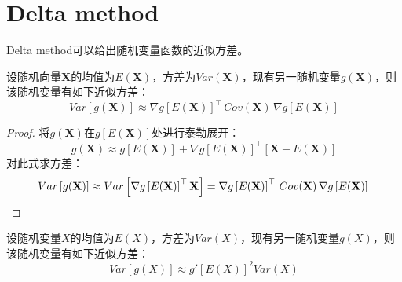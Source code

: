 \section{Delta method}
Delta method可以给出随机变量函数的近似方差。
\begin{theorem}\label{sec:deltamethod}
	设随机向量$\mathbf{X}$的均值为$E(\mathbf{X})$，方差为$Var(\mathbf{X})$，现有另一随机变量$g(\mathbf{X})$，则该随机变量有如下近似方差：
	\begin{equation*}
		Var[g(\mathbf{X})] \approx \nabla g\left[ E(\mathbf{X})\right]^{\top} \, Cov(\mathbf{X}) \, \nabla g\left[E(\mathbf{X})\right] 
	\end{equation*}
\end{theorem}
\begin{proof}
	将$g(\mathbf{X})$在$g\left[E(\mathbf{X})\right]$处进行泰勒展开：
	\begin{equation*}
		g(\mathbf{X})\approx g\left[E(\mathbf{X})\right]+
		\nabla g\left[E(\mathbf{X})\right]^{\top}\left[\mathbf{X}-E(\mathbf{X})\right]
	\end{equation*}
	对此式求方差：
	\begin{equation*}
		Var\left[g(\mathbf{X})\right]\approx Var\left[ \nabla g\left[E(\mathbf{X})\right]^{\top}\mathbf{X}\right]=\nabla g\left[ E(\mathbf{X})\right] ^{\top} \, Cov(\mathbf{X}) \, \nabla g\left[E(\mathbf{X})\right]\qedhere
	\end{equation*}
\end{proof}
\begin{corollary}
	设随机变量$X$的均值为$E(X)$，方差为$Var(X)$，现有另一随机变量$g(X)$，则该随机变量有如下近似方差：
	\begin{equation*}
		Var\left[g(X)\right]\approx g'\left[E(X)\right]^2Var(X)
	\end{equation*}
\end{corollary}